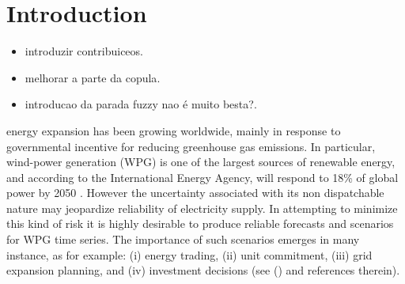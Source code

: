 \documentclass[a4paper]{IEEEtran}
\begin{document}

\section{Introduction}
\label{Introduction}

\begin{itemize}
	
	\item {\color{red} introduzir contribuiceos}.
	
	\item {\color{red} melhorar a parte da copula}.
	
	\item {\color{red} introducao da parada fuzzy nao é muito besta?}.
	
\end{itemize}

 energy expansion has been growing worldwide, mainly in response to governmental incentive for reducing greenhouse gas emissions. In particular, wind-power generation (WPG) is one of the largest sources of renewable energy, and according to the International Energy Agency, will respond to 18\% of global power by 2050  \cite{IntEnerAgency}. However the uncertainty associated with its non dispatchable nature may jeopardize reliability of electricity supply. In attempting to minimize this kind of risk it is highly desirable to produce reliable forecasts and scenarios for WPG time series. The importance of such scenarios emerges in many instance, as for example: (i) energy trading, (ii) unit commitment, (iii) grid expansion planning, and (iv) investment decisions (see (\cite{moreiraStreet,jabr2013robust,zhaoguan,Aderson2017}) and references therein). 


\end{document}
